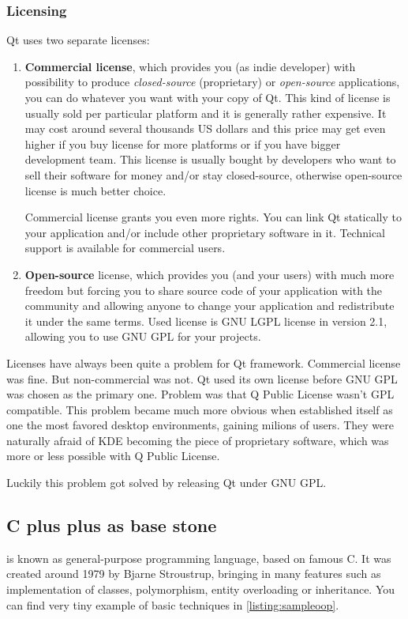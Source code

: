 \subsubsection{Licensing}
Qt uses two separate licenses:
\begin{enumerate}
\item \textbf{Commercial license}, which provides you (as indie developer) with possibility to produce \textit{closed-source} (proprietary) or \textit{open-source} applications, you can do whatever you want with your copy of Qt. This kind of license is usually sold per particular platform and it is generally rather expensive. It may cost around several thousands US dollars and this price may get even higher if you buy license for more platforms or if you have bigger development team. This license is usually bought by developers who want to sell their software for money and/or stay closed-source, otherwise open-source license is much better choice.

Commercial license grants you even more rights. You can link Qt statically to your application and/or include other proprietary software in it. Technical support is available for commercial users.

\item \textbf{Open-source} license, which provides you (and your users) with much more freedom but forcing you to share source code of your application with the community and allowing anyone to change your application and redistribute it under the same terms. Used license is GNU LGPL license in version 2.1, allowing you to use GNU GPL\citep{stallman:gnugpl} for your projects.
\end{enumerate}

Licenses have always been quite a problem for Qt framework. Commercial license was fine. But non-commercial was not. Qt used its own license before GNU GPL was chosen as the primary one. Problem was that Q Public License wasn't GPL compatible. This problem became much more obvious when  established itself as one the most favored desktop environments, gaining milions of users. They were naturally afraid of KDE becoming the piece of proprietary software, which was more or less possible with Q Public License.

Luckily this problem got solved by releasing Qt under GNU GPL.

\subsection{C plus plus as base stone}\label{subsection:cpp}
\cpp is known as general-purpose programming language, based on famous C. It was created around 1979 by Bjarne Stroustrup, bringing in many  features such as implementation of classes, polymorphism, entity overloading or inheritance. You can find very tiny example of basic techniques in \autoref{listing:sampleoop}.

